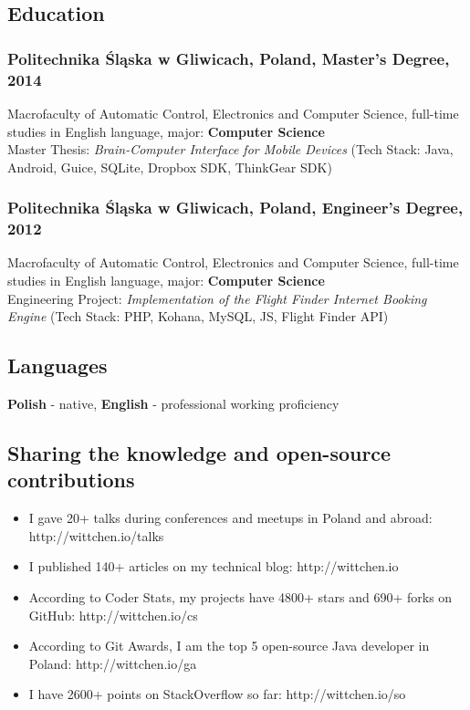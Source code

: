 \documentclass[8pt]{extarticle}
\begin{document}
    \subsection*{\normalsize{Education}}

      \subsubsection*{\normalsize{Politechnika \'Sl\k{a}ska w Gliwicach, Poland, Master's Degree, 2014}}
      Macrofaculty of Automatic Control, Electronics and Computer Science, 
      full-time studies in English language, major: \textbf{Computer Science}\\
      Master Thesis: \textit{Brain-Computer Interface for Mobile Devices} 
      (Tech Stack: Java, Android, Guice, SQLite, Dropbox SDK, ThinkGear SDK)

      \subsubsection*{\normalsize{Politechnika \'Sl\k{a}ska w Gliwicach, Poland, Engineer's Degree, 2012}}
      Macrofaculty of Automatic Control, Electronics and Computer Science, 
      full-time studies in English language, major: \textbf{Computer Science}\\
      Engineering Project: \textit{Implementation of the Flight Finder Internet Booking Engine}
      (Tech Stack: PHP, Kohana, MySQL, JS, Flight Finder API)

    \subsection*{\normalsize{Languages}}
    \textbf{Polish} - native, \textbf{English} - professional working proficiency

    \subsection*{\normalsize{Sharing the knowledge and open-source contributions}}
    \begin{itemize}
      \item I gave 20+ talks during conferences and meetups in Poland and abroad: http://wittchen.io/talks
      \item I published 140+ articles on my technical blog: http://wittchen.io
      \item According to Coder Stats, my projects have 4800+ stars and 690+ forks on GitHub: http://wittchen.io/cs
      \item According to Git Awards, I am the top 5 open-source Java developer in Poland: http://wittchen.io/ga
      \item I have 2600+ points on StackOverflow so far: http://wittchen.io/so
    \end{itemize}
\end{document}
